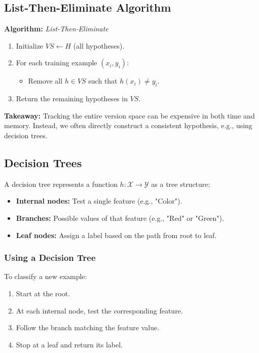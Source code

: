 \subsection{List-Then-Eliminate Algorithm}

\begin{algobox}
\textbf{Algorithm:} \emph{List-Then-Eliminate}
\begin{enumerate}
    \item Initialize $VS \leftarrow H$ (all hypotheses).
    \item For each training example $(x_i, y_i)$:
    \begin{itemize}
        \item Remove all $h \in VS$ such that $h(x_i) \neq y_i$.
    \end{itemize}
    \item Return the remaining hypotheses in $VS$.
\end{enumerate}
\end{algobox}

\textbf{Takeaway:}  
Tracking the entire version space can be expensive in both time and memory.  
Instead, we often directly construct a consistent hypothesis, e.g., using decision trees.

\subsection{Decision Trees}

\begin{definition}
A decision tree represents a function $h: \mathcal{X} \to \mathcal{Y}$ as a tree structure:
\begin{itemize}
    \item \textbf{Internal nodes:} Test a single feature (e.g., "Color").
    \item \textbf{Branches:} Possible values of that feature (e.g., "Red" or "Green").
    \item \textbf{Leaf nodes:} Assign a label based on the path from root to leaf.
\end{itemize}
\end{definition}

\subsubsection*{Using a Decision Tree}
To classify a new example:
\begin{enumerate}
    \item Start at the root.
    \item At each internal node, test the corresponding feature.
    \item Follow the branch matching the feature value.
    \item Stop at a leaf and return its label.
\end{enumerate}

